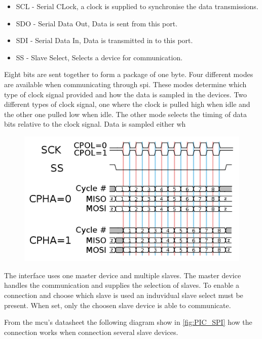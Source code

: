 \begin{itemize}[noitemsep]
	\item SCL - Serial CLock, a clock is supplied to synchronise the data transmissions.
	\item SDO - Serial Data Out, Data is sent from this port.
	\item SDI - Serial Data In, Data is transmitted in to this port.
	\item SS - Slave Select, Selects a device for communication.
\end{itemize}
 
Eight bits are sent together to form a package of one byte. Four different modes are available when communicating through \gls{spi}. These modes determine which type of clock signal provided and how the data is sampled in the devices. Two different types of clock signal, one where the clock is pulled high when idle and the other one pulled low when idle. 
The other mode selects the timing of data bits relative to the clock signal. Data is sampled either wh


\begin{figure}[H]
	\centering
    \includegraphics[width=.8\linewidth]{Figures/SPI_timing}
	\label{fig:SPI_timing}
\end{figure}


The interface uses one master device and multiple slaves. The master device handles the communication and supplies the selection of slaves. To enable a connection and choose which slave is used an induvidual slave select must be present. When set, only the choosen slave device is able to communicate.

From the \gls{mcu}'s datasheet the following diagram show in \autoref{fig:PIC_SPI} how the connection works when connection several slave devices.

